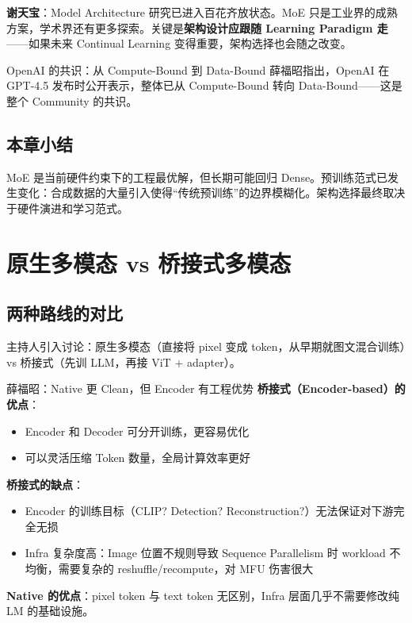 \documentclass[a4paper]{article}
\begin{document}
\textbf{谢天宝}：Model Architecture 研究已进入百花齐放状态。MoE 只是工业界的成熟方案，学术界还有更多探索。关键是\textbf{架构设计应跟随 Learning Paradigm 走}——如果未来 Continual Learning 变得重要，架构选择也会随之改变。

\begin{warningbox}{OpenAI 的共识：从 Compute-Bound 到 Data-Bound}
薛福昭指出，OpenAI 在 GPT-4.5 发布时公开表示，整体已从 Compute-Bound 转向 Data-Bound——这是整个 Community 的共识。
\end{warningbox}

\subsection{本章小结}
MoE 是当前硬件约束下的工程最优解，但长期可能回归 Dense。预训练范式已发生变化：合成数据的大量引入使得``传统预训练''的边界模糊化。架构选择最终取决于硬件演进和学习范式。

\section{原生多模态 vs 桥接式多模态}

\subsection{两种路线的对比}

主持人引入讨论：原生多模态（直接将 pixel 变成 token，从早期就图文混合训练）vs 桥接式（先训 LLM，再接 ViT + adapter）。

\begin{importantbox}{薛福昭：Native 更 Clean，但 Encoder 有工程优势}
\textbf{桥接式（Encoder-based）的优点}：
\begin{itemize}
  \item Encoder 和 Decoder 可分开训练，更容易优化
  \item 可以灵活压缩 Token 数量，全局计算效率更好
\end{itemize}
\textbf{桥接式的缺点}：
\begin{itemize}
  \item Encoder 的训练目标（CLIP? Detection? Reconstruction?）无法保证对下游完全无损
  \item Infra 复杂度高：Image 位置不规则导致 Sequence Parallelism 时 workload 不均衡，需要复杂的 reshuffle/recompute，对 MFU 伤害很大
\end{itemize}
\textbf{Native 的优点}：pixel token 与 text token 无区别，Infra 层面几乎不需要修改纯 LM 的基础设施。
\end{importantbox}
\end{document}
